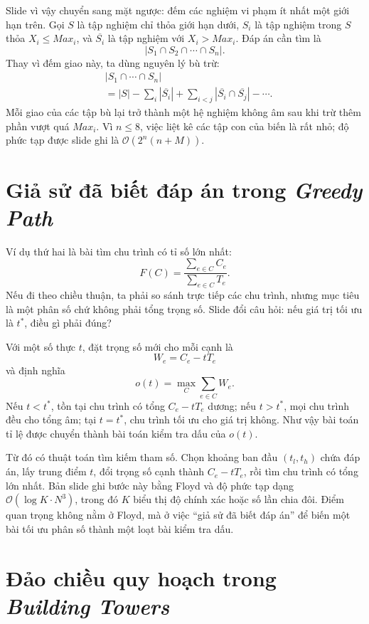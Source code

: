 \documentclass[11pt]{article}
\newcommand{\Oh}{\mathcal{O}}
\begin{document}
Slide vì vậy chuyển sang mặt ngược: đếm các nghiệm vi phạm ít nhất một giới
hạn trên. Gọi \(S\) là tập nghiệm chỉ thỏa giới hạn dưới, \(S_i\) là tập nghiệm
trong \(S\) thỏa \(X_i\le \mathit{Max}_i\), và \(\overline{S_i}\) là tập nghiệm
với \(X_i>\mathit{Max}_i\). Đáp án cần tìm là
\[
  |S_1\cap S_2\cap\cdots\cap S_n|.
\]
Thay vì đếm giao này, ta dùng nguyên lý bù trừ:
\[
\begin{aligned}
&|S_1\cap\cdots\cap S_n|\\
&=|S|-\sum_i|\overline{S_i}|
  +\sum_{i<j}|\overline{S_i}\cap\overline{S_j}|-\cdots .
\end{aligned}
\]
Mỗi giao của các tập bù lại trở thành một hệ nghiệm không âm sau khi trừ thêm
phần vượt quá \(\mathit{Max}_i\). Vì \(n\le 8\), việc liệt kê các tập con của
biến là rất nhỏ; độ phức tạp được slide ghi là \(\Oh(2^n(n+M))\).

\section{Giả sử đã biết đáp án trong \textit{Greedy Path}}

Ví dụ thứ hai là bài tìm chu trình có tỉ số lớn nhất:
\[
  F(C)=\frac{\sum_{e\in C} C_e}{\sum_{e\in C} T_e}.
\]
Nếu đi theo chiều thuận, ta phải so sánh trực tiếp các chu trình, nhưng mục
tiêu là một phân số chứ không phải tổng trọng số. Slide đổi câu hỏi: nếu giá
trị tối ưu là \(t^*\), điều gì phải đúng?

Với một số thực \(t\), đặt trọng số mới cho mỗi cạnh là
\[
  W_e=C_e-tT_e
\]
và định nghĩa
\[
  o(t)=\max_C\sum_{e\in C} W_e.
\]
Nếu \(t<t^*\), tồn tại chu trình có tổng \(C_e-tT_e\) dương; nếu \(t>t^*\),
mọi chu trình đều cho tổng âm; tại \(t=t^*\), chu trình tối ưu cho giá trị
không. Như vậy bài toán tỉ lệ được chuyển thành bài toán kiểm tra dấu của
\(o(t)\).

Từ đó có thuật toán tìm kiếm tham số. Chọn khoảng ban đầu \((t_l,t_h)\) chứa
đáp án, lấy trung điểm \(t\), đổi trọng số cạnh thành \(C_e-tT_e\), rồi tìm
chu trình có tổng lớn nhất. Bản slide ghi bước này bằng Floyd và độ phức tạp
dạng \(\Oh(\log K\cdot N^3)\), trong đó \(K\) biểu thị độ chính xác hoặc số
lần chia đôi. Điểm quan trọng không nằm ở Floyd, mà ở việc ``giả sử đã biết
đáp án'' để biến một bài tối ưu phân số thành một loạt bài kiểm tra dấu.

\section{Đảo chiều quy hoạch trong \textit{Building Towers}}
\end{document}
